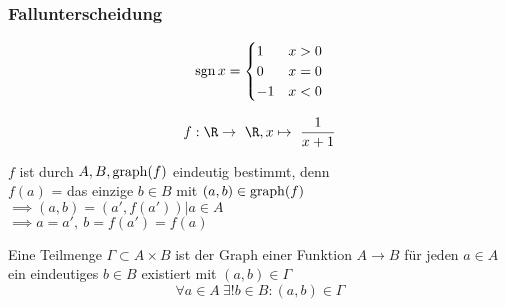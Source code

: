 \subsubsection{Fallunterscheidung}
\begin{bsp*}[note = $\sgn : \R \rightarrow \R$]
	\[
		\operatorname{sgn} x =
		\begin{cases}
			1	&x > 0	\\
			0	&x = 0	\\
			-1	&x < 0	
		\end{cases}
	\]
\end{bsp*}
\begin{bsp*}
	\[ f: \R \rightarrow \R, x \mapsto \frac{1}{x+1} \]
\end{bsp*}
\begin{fakt}
	$f$ ist durch $A , B , \operatorname{graph}(f)$ eindeutig bestimmt, denn \\
	$f(a)$ = das einzige $b \in B$ mit $(a,b) \in \operatorname{graph}(f)$ \\
	$\implies (a,b) = (a',f(a')) | a \in A$ \\
	$\implies a = a', \: b = f(a') = f(a)$
\end{fakt}
\begin{bem}
	Eine Teilmenge $\Gamma \subset A \times B$ ist der Graph einer Funktion $A \rightarrow B$ \gdw für jeden $a \in A$ ein eindeutiges $b \in B$ existiert mit $(a,b) \in \Gamma$ \\
	\[ \forall a \in A \:\exists! b \in B : (a,b) \in \Gamma \]
\end{bem}

